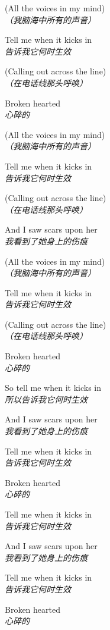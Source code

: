 \begin{spacing}{1.5}
\begin{flushleft}
(All the voices in my mind)\\
\textit{（我脑海中所有的声音）}\lyricspace

Tell me when it kicks in\\
\textit{告诉我它何时生效}\lyricspace

(Calling out across the line)\\
\textit{（在电话线那头呼唤）}\lyricspace

Broken hearted\\
\textit{心碎的}\lyricspace

(All the voices in my mind)\\
\textit{（我脑海中所有的声音）}\lyricspace

Tell me when it kicks in\\
\textit{告诉我它何时生效}\lyricspace

(Calling out across the line)\\
\textit{（在电话线那头呼唤）}\lyricspace

And I saw scars upon her\\
\textit{我看到了她身上的伤痕}\lyricspace

(All the voices in my mind)\\
\textit{（我脑海中所有的声音）}\lyricspace

Tell me when it kicks in\\
\textit{告诉我它何时生效}\lyricspace

(Calling out across the line)\\
\textit{（在电话线那头呼唤）}\lyricspace

Broken hearted\\
\textit{心碎的}\lyricspace

So tell me when it kicks in\\
\textit{所以告诉我它何时生效}\lyricspace

And I saw scars upon her\\
\textit{我看到了她身上的伤痕}\lyricspace

Tell me when it kicks in\\
\textit{告诉我它何时生效}\lyricspace

Broken hearted\\
\textit{心碎的}\lyricspace

Tell me when it kicks in\\
\textit{告诉我它何时生效}\lyricspace

And I saw scars upon her\\
\textit{我看到了她身上的伤痕}\lyricspace

Tell me when it kicks in\\
\textit{告诉我它何时生效}\lyricspace

Broken hearted\\
\textit{心碎的}\lyricspace
\end{flushleft}
\end{spacing} 
